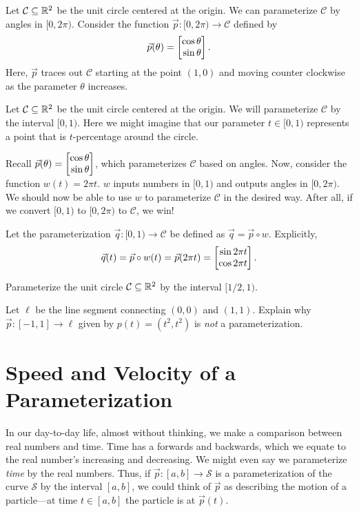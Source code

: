 \begin{example}[A Circle]
	Let $\mathcal C\subseteq \mathbb{R}^2$ be the unit circle centered at the origin.
	We can parameterize $\mathcal C$ by angles in $[0,2\pi)$.  Consider the function
	$\vec p:[0,2\pi)\to\mathcal C$ defined by
	\[
		\vec p(\theta) = \mat{\cos\theta \\\sin \theta}.	
	\]
	Here, $\vec p$ traces out $\mathcal C$ starting at the point $(1,0)$ and
	moving counter clockwise as the parameter $\theta$ increases.
\end{example}
\begin{example}
	Let $\mathcal C\subseteq \mathbb{R}^2$ be the unit circle centered at the origin.
	We will parameterize $\mathcal C$ by the interval $[0,1)$.  Here we might
	imagine that our parameter $t\in[0,1)$ represents a point that is $t$-percentage
	around the circle.  
	
	Recall $\vec p(\theta)=\mat{\cos \theta\\\sin\theta}$, which parameterizes
	$\mathcal C$ based on angles.  Now, consider the function $w(t) =2\pi t$.
	$w$ inputs numbers in $[0,1)$ and outputs angles in $[0,2\pi)$.  We should
	now be able to use $w$ to parameterize $\mathcal C$ in the desired way.
	After all, if we convert $[0,1)$ to $[0,2\pi)$ to $\mathcal C$, we win!

	Let the parameterization
		$\vec q:[0,1)\to\mathcal C$ be defined as $\vec q=\vec p\circ w$.
	Explicitly,
	\[
		\vec q(t) = \vec p\circ w(t) = \vec p(2\pi t) = \mat{\sin 2\pi t\\\cos 2\pi t}.	
	\]
\end{example}

\begin{exercise}
	Parameterize the unit circle $\mathcal C\subseteq \mathbb{R}^2$ by the interval $[1/2,1)$.
\end{exercise}
\begin{exercise}
	Let $\ell$ be the line segment connecting $(0,0)$ and $(1,1)$.
	Explain why $\vec p:[-1,1]\to\ell$ given by $p(t)=(t^2,t^2)$ is \emph{not}
	a parameterization.
\end{exercise}

\section{Speed and Velocity of a Parameterization}

In our day-to-day life, almost without thinking, we make a comparison between real numbers
and time.  Time has a forwards and backwards, which we equate to
the real number's increasing and decreasing.  We might even say we parameterize \emph{time}
by the real numbers.  Thus, if $\vec p:[a,b]\to \mathcal S$ is a parameterization 
of the curve $\mathcal S$ by the interval $[a,b]$, we could think of $\vec p$ as describing
the motion of a particle---at time $t\in[a,b]$ the particle is at $\vec p(t)$.

